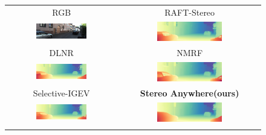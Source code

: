 \documentclass[10pt,twocolumn,letterpaper]{article}
\newcommand{\method}[0]{Stereo Anywhere\xspace}
\begin{document}
\begin{figure}[h]
    \centering
    \renewcommand{\tabcolsep}{1pt}
    \begin{tabular}{cc}

        \small RGB &
        \small RAFT-Stereo \cite{lipson2021raft} \\
        \includegraphics[width=0.48\textwidth]{imgs/KITTI12/rgb/40.jpg} &
        \includegraphics[width=0.48\textwidth]{imgs/KITTI12/stereo/RAFT-Stereo/40.jpg} \\
        \small DLNR \cite{zhao2023high} &
        \small NMRF \cite{guan2024neural} \\
        \includegraphics[width=0.48\textwidth]{imgs/KITTI12/stereo/DLNR/40.jpg} &
        \includegraphics[width=0.48\textwidth]{imgs/KITTI12/stereo/NMRF/40.jpg} \\
        \small Selective-IGEV \cite{wang2024selective} &
        \textbf{\method (ours)} \\
        \includegraphics[width=0.48\textwidth]{imgs/KITTI12/stereo/Selective/40.jpg} &
        \includegraphics[width=0.48\textwidth]{imgs/KITTI12/stereo/Ours/40.jpg} \\ \\


\end{tabular}
\end{figure}
\end{document}
